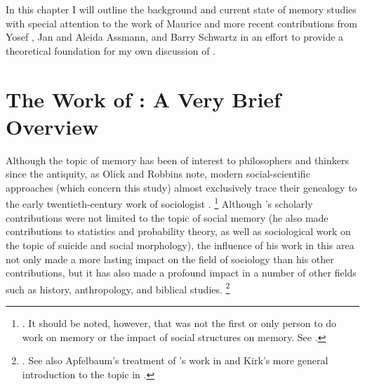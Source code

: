 In this chapter I will outline the background and current state of memory studies with special attention to the work of Maurice \halbwachs and more recent contributions from Yosef \yerushalmi, Jan and Aleida Assmann, and Barry Schwartz in an effort to provide a theoretical foundation for my own discussion of \rwb.

\section{The Work of \Halbwachs: A Very Brief Overview}

Although the topic of memory has been of interest to philosophers and thinkers since the antiquity,%
    \autocite{carruthers_radstone-schwarz2011}
as Olick and Robbins note, modern social-scientific approaches (which concern this study) almost exclusively trace their genealogy to the early twentieth-century work of sociologist \Halbwachs.%
    \footnote{%
        \cite[106]{olick-robbins_ars1998}.
        It should be noted, however, that \halbwachs was not the first or only person to do work on memory or the impact of social structures on memory. See 
        \cite[8--36]{olick_olick-etal2011}.}
Although \halbwachs's scholarly contributions were not limited to the topic of social memory (he also made contributions to statistics and probability theory, as well as sociological work on the topic of suicide and social morphology), the influence of his work in this area not only made a more lasting impact on the field of sociology than his other contributions, but it has also made a profound impact in a number of other fields such as history, anthropology, and biblical studies.%
    \footnote{%
        \Cite[13--20]{coser_halbwachs1992}. See also Apfelbaum's treatment of \halbwachs's work in 
        \cite{apfelbaum_radstone-schwarz2011} and Kirk's more general introduction to the topic in
        \cite{kirk_kirk-thatcher2005}.}

